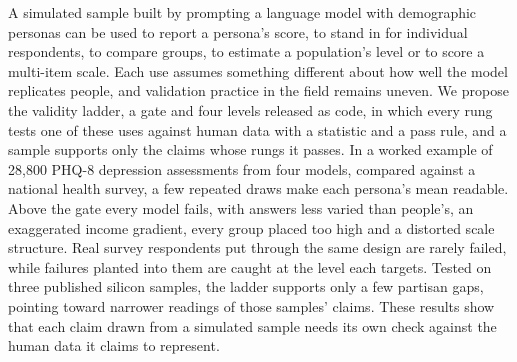 A simulated sample built by prompting a language model with demographic personas can be used to report a persona's score, to stand in for individual respondents, to compare groups, to estimate a population's level or to score a multi-item scale.
Each use assumes something different about how well the model replicates people, and validation practice in the field remains uneven.
We propose the validity ladder, a gate and four levels released as code, in which every rung tests one of these uses against human data with a statistic and a pass rule, and a sample supports only the claims whose rungs it passes.
In a worked example of 28,800 PHQ-8 depression assessments from four models, compared against a national health survey, a few repeated draws make each persona's mean readable.
Above the gate every model fails, with answers less varied than people's, an exaggerated income gradient, every group placed too high and a distorted scale structure.
Real survey respondents put through the same design are rarely failed, while failures planted into them are caught at the level each targets.
Tested on three published silicon samples, the ladder supports only a few partisan gaps, pointing toward narrower readings of those samples' claims.
These results show that each claim drawn from a simulated sample needs its own check against the human data it claims to represent.
